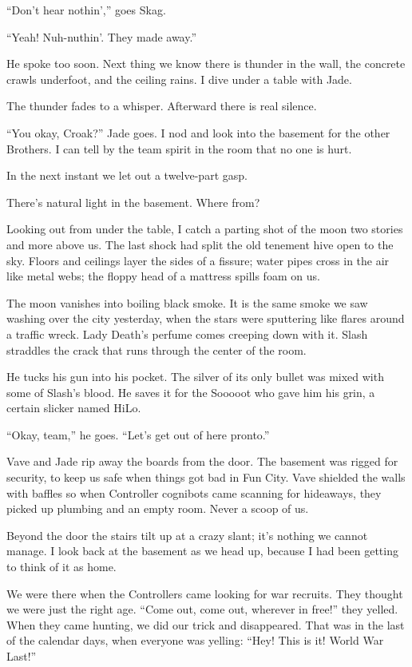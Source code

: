 ``Don't hear nothin','' goes Skag.

``Yeah! Nuh-nuthin'. They made away.''

He spoke too soon. Next thing we know there is thunder in the wall, the concrete crawls underfoot, and the ceiling rains. I dive under a table with Jade.

The thunder fades to a whisper. Afterward there is real silence.

``You okay, Croak?'' Jade goes. I nod and look into the basement for the other Brothers. I can tell by the team spirit in the room that no one is hurt.

In the next instant we let out a twelve-part gasp.

There's natural light in the basement. Where from?

Looking out from under the table, I catch a parting shot of the moon two stories and more above us. The last shock had split the old tenement hive open to the sky. Floors and ceilings layer the sides of a fissure; water pipes cross in the air like metal webs; the floppy head of a mattress spills foam on us.

The moon vanishes into boiling black smoke. It is the same smoke we saw washing over the city yesterday, when the stars were sputtering like flares around a traffic wreck. Lady Death's perfume comes creeping down with it.
Slash straddles the crack that runs through the center of the room.

He tucks his gun into his pocket. The silver of its only bullet was mixed with some of Slash's blood. He saves it for the Sooooot who gave him his grin, a certain slicker named HiLo.

``Okay, team,'' he goes. ``Let's get out of here pronto.''

Vave and Jade rip away the boards from the door. The basement was rigged for security, to keep us safe when things got bad in Fun City. Vave shielded the walls with baffles so when Controller cognibots came scanning for hideaways, they picked up plumbing and an empty room. Never a scoop of us.

Beyond the door the stairs tilt up at a crazy slant; it's nothing we cannot manage. I look back at the basement as we head up, because I had been getting to think of it as home.

We were there when the Controllers came looking for war recruits. They thought we were just the right age.
``Come out, come out, wherever in free!'' they yelled. When they came hunting, we did our trick and disappeared.
That was in the last of the calendar days, when everyone was yelling: ``Hey! This is it! World War Last!''


